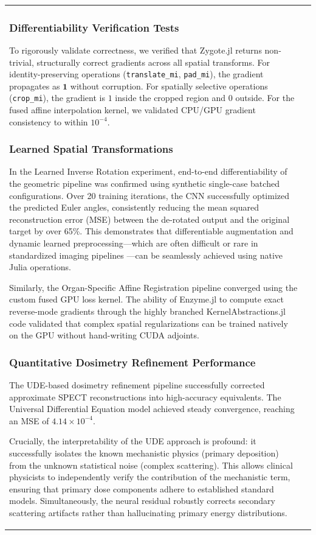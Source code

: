 \documentclass[10pt,letterpaper]{article}
\begin{document}
\begin{table}[H]
\begin{tabular}{|p{}|p{}|}
\subsubsection*{Differentiability Verification Tests}
To rigorously validate correctness, we verified that Zygote.jl returns non-trivial, structurally correct gradients across all spatial transforms. For identity-preserving operations (\texttt{translate\_mi}, \texttt{pad\_mi}), the gradient propagates as $\mathbf{1}$ without corruption. For spatially selective operations (\texttt{crop\_mi}), the gradient is $1$ inside the cropped region and $0$ outside. For the fused affine interpolation kernel, we validated CPU/GPU gradient consistency to within $10^{-4}$.

\subsubsection*{Learned Spatial Transformations}
In the Learned Inverse Rotation experiment, end-to-end differentiability of the geometric pipeline was confirmed using synthetic single-case batched configurations. Over 20 training iterations, the CNN successfully optimized the predicted Euler angles, consistently reducing the mean squared reconstruction error (MSE) between the de-rotated output and the original target by over 65\%. This demonstrates that differentiable augmentation and dynamic learned preprocessing---which are often difficult or rare in standardized imaging pipelines \cite{Shi_2023}---can be seamlessly achieved using native Julia operations.

Similarly, the Organ-Specific Affine Registration pipeline converged using the custom fused GPU loss kernel. The ability of Enzyme.jl to compute exact reverse-mode gradients through the highly branched KernelAbstractions.jl code validated that complex spatial regularizations can be trained natively on the GPU without hand-writing CUDA adjoints.

\subsubsection*{Quantitative Dosimetry Refinement Performance}
The UDE-based dosimetry refinement pipeline successfully corrected approximate SPECT reconstructions into high-accuracy equivalents. The Universal Differential Equation model achieved steady convergence, reaching an MSE of $4.14 \times 10^{-4}$. 

Crucially, the interpretability of the UDE approach is profound: it successfully isolates the known mechanistic physics (primary deposition) from the unknown statistical noise (complex scattering). This allows clinical physicists to independently verify the contribution of the mechanistic term, ensuring that primary dose components adhere to established standard models. Simultaneously, the neural residual robustly corrects secondary scattering artifacts rather than hallucinating primary energy distributions. 


\end{tabular}
\end{table}
\end{document}
